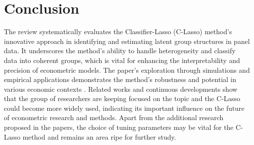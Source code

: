 \documentclass[UTF8,a4paper,10pt]{article}
\begin{document}




\section{Conclusion}
The review systematically evaluates the Classifier-Lasso (C-Lasso) method's innovative approach in identifying and estimating latent group structures in panel data. It underscores the method's ability to handle heterogeneity and classify data into coherent groups, which is vital for enhancing the interpretability and precision of econometric models. The paper's exploration through simulations and empirical applications demonstrates the method's robustness and potential in various economic contexts 
. 
Related works and continuous developments show that the group of researchers are keeping focused on the topic and the C-Lasso could become more widely used, indicating its important influence on the future of econometric research and methods. 
Apart from the additional research proposed in the papers, the choice of tuning parameters may be vital for the C-Lasso method and remains an area ripe for further study. 
\end{document}
